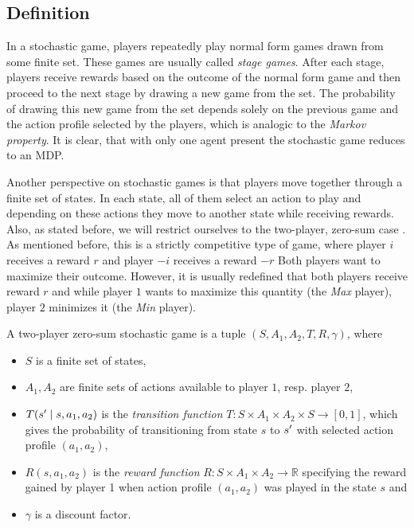 \documentclass[../main.tex]{subfiles}
\begin{document}
\subsection{Definition}\label{bg:sg:def}
In a stochastic game, players repeatedly play normal form games drawn from some finite set.
These games are usually called \textit{stage games}.
After each stage, players receive rewards based on the outcome of the normal form game and then proceed to the next stage by drawing a new game from the set.
The probability of drawing this new game from the set depends solely on the previous game and the action profile selected by the players, which is analogic to the \textit{Markov property}.
It is clear, that with only one agent present the stochastic game reduces to an MDP.

Another perspective on stochastic games is that players move together through a finite set of states.
In each state, all of them select an action to play and depending on these actions they move to another state while receiving rewards.
Also, as stated before, we will restrict ourselves to the two-player, zero-sum case .
As mentioned before, this is a strictly competitive type of game, where player $i$ receives a reward $r$ and player $-i$ receives a reward $-r$
Both players want to maximize their outcome.
However, it is usually redefined that both players receive reward $r$ and while player $1$ wants to maximize this quantity (the \textit{Max} player), player $2$ minimizes it (the \textit{Min} player).

\begin{definition}\label{bg:sg:def:def}
    A two-player zero-sum stochastic game\cite{poposgsthesis} is a tuple $\left(S, A_1, A_2, T, R, \gamma\right)$, where
    \begin{itemize}
        \item $S$ is a finite set of states,
        \item $A_1, A_2$ are finite sets of actions available to player $1$, resp. player $2$,
        \item $T(s^{\prime} \mid s, a_1, a_2)$ is the \textit{transition function} $T: S \times A_1 \times A_2 \times S \to [0, 1]$, which gives the probability of transitioning from state $s$ to $s^{\prime}$ with selected action profile $(a_1, a_2)$,
        \item $R(s, a_1, a_2)$ is the \textit{reward function} $R: S \times A_1 \times A_2 \to \mathbb{R}$ specifying the reward gained by player 1 when action profile $(a_1, a_2)$ was played in the state $s$ and
        \item $\gamma$ is a discount factor.
    \end{itemize}
\end{definition}
\end{document}
